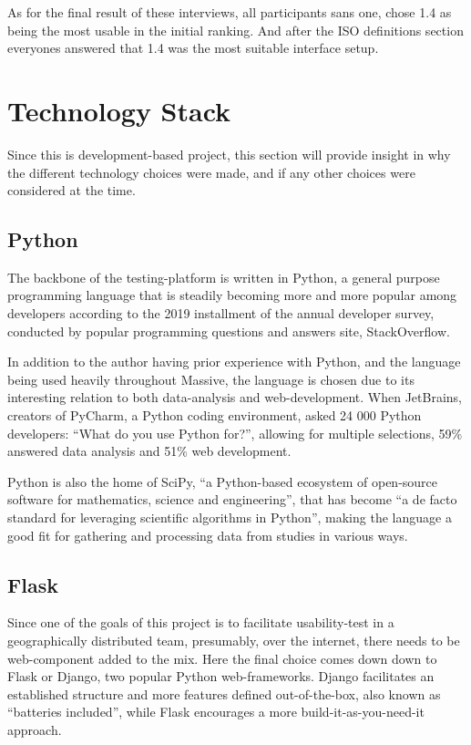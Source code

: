 {    As for the final result of these interviews, all participants sans one,
    chose 1.4 as being the most usable in the initial ranking. And after the
    ISO definitions section everyones answered that 1.4 was the most suitable
    interface setup.

\section{Technology Stack}

  Since this is development-based project, this section will provide insight in
  why the different technology choices were made, and if any other
  choices were considered at the time.

  \subsection{Python}

  The backbone of the testing-platform is written in  Python\cite{citePython},
  a general purpose programming language that is steadily becoming
  more and more popular among developers according to the 2019 installment of
  the annual developer survey\cite{citeStackOverflow2019Survey},
  conducted by popular programming questions and answers site,
  StackOverflow\cite{citeStackOverflow}.

  In addition to the author having prior experience with Python, and the
  language being used heavily throughout Massive, the language
  is chosen due to its interesting relation to both data-analysis and
  web-development. When
  JetBrains\cite{citeJetBrains},
  creators of
  PyCharm\cite{citePyCharm},
  a Python coding environment, asked 24 000 Python
  developers:
  ``What do you use Python for?''\cite{citeJetSurvey}, allowing for multiple
  selections, 59\% answered data analysis and 51\% web development.

  Python is also the home of SciPy, ``a Python-based ecosystem of open-source
  software for mathematics, science and engineering''\cite{citeSciPyHomepage},
  that has become ``a de facto
  standard for leveraging scientific algorithms in
  Python''\cite{citeSciPyPaper}, making the language a good fit for gathering
  and processing data from studies in various ways.

  \subsection{Flask}

  Since one of the goals of this project is to facilitate usability-test in a
  geographically distributed team, presumably, over the internet, there
  needs to be web-component added to the mix. Here the final choice comes down
  down to Flask\cite{citeFlaskHomepage} or Django\cite{citeDjangoHomepage},
  two popular Python web-frameworks. Django facilitates an established
  structure and more features defined out-of-the-box, also known as ``batteries
  included'', while Flask encourages a more build-it-as-you-need-it approach.

}
